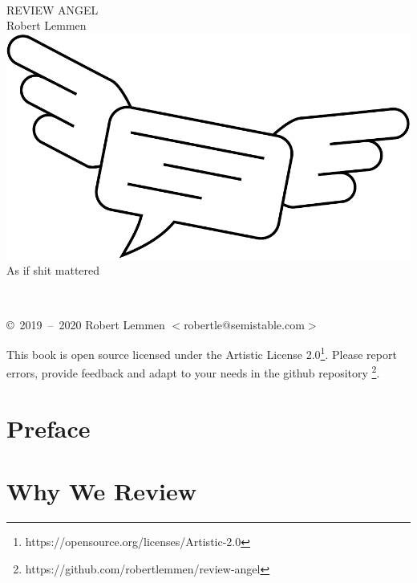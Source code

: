 \documentclass[10pt,twoside]{article}
\begin{document}
\begin{titlepage}
\begin{center}~\\
\vspace{4em}
{\fontsize{32}{32}\selectfont
REVIEW ANGEL}\\
\vspace{36pt}
{\large Robert Lemmen}
\vfill
\includegraphics[width=\textwidth]{logo}
\vfill
{\large As if shit mattered}
\vspace{3em}
\end{center}
\end{titlepage}
\thispagestyle{empty}
\clearpage

\ifdefined\gitversion\gitversion\fi~

\vspace{1.5em}
\copyright~2019~--~2020 Robert Lemmen $<$robertle@semistable.com$>$


\vspace{1.5em}
This book is open source licensed under the Artistic License 2.0\footnote{
https://opensource.org/licenses/Artistic-2.0}. Please report errors, provide
feedback and adapt to your needs in the github repository \footnote{
https://github.com/robertlemmen/review-angel}.
\thispagestyle{empty}
\clearpage

\tableofcontents
\clearpage

\section{Preface}
\section{Why We Review}
\end{document}
